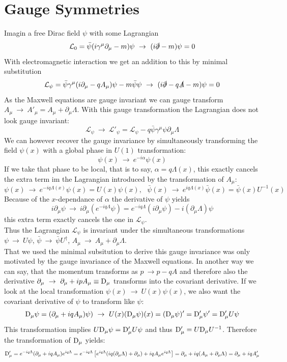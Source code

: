 \documentclass{include/thesisclass}
\newcommand{\LL}{\mathcal{L}}
\newcommand{\Dd}{{\rm D}}
\newcommand{\df}{\rightarrow}
\newcommand{\p}{\partial}
\begin{document}
\section{Gauge Symmetries}
Imagin a free Dirac field $\psi$ with some Lagrangian
\[ \LL_0 = \bar{\psi}( i \gamma^\mu \p_\mu - m) \psi ~\df~(i \slashed{\p} - m )\psi = 0\]
With electromagnetic interaction we get an addition to this by minimal substitution
\[ \LL_\psi = \bar{\psi}\gamma^\mu ( i \p_\mu - q A_\mu) \psi - m \bar{\psi}\psi ~\df~ (i \slashed{\p} - q \slashed{A}- m) \psi = 0\]
As the Maxwell equations are gauge invariant we can gauge transform $A_\mu ~\df~A'_\mu = A_\mu + \p_\mu \Lambda$. With this gauge transformation the Lagrangian does not look gauge invariant:
\[\LL_\psi ~\df~ \LL'_\psi = \LL_\psi - q \bar{\psi}\gamma^\mu \psi \p_\mu \Lambda\]
We can however recover the gauge invariance by simultaneously transforming the field $\psi(x)$ with a global phase in $U(1)$ transformation:
\[ \psi(x) ~\df~ e^{-i \alpha} \psi(x)\]
If we take that phase to be local, that is to say, $\alpha = q \Lambda(x)$, this exactly cancels the extra term im the Lagrangian introduced by the transformation of $A_\mu$:
\[ \psi(x) ~\df~ e^{-iq \Lambda(x)} \psi(x) = U(x) \psi(x),~~~ \bar{\psi}(x) ~\df~ e^{iq\Lambda(x)} \bar{\psi}(x) = \bar{\psi}(x) U^{-1}(x)\]
Because of the $x$-dependance of $\alpha$ the derivative of $\psi$ yields
\[ i \p_\mu \psi ~\df~ i \p_\mu ( e^{-iq\Lambda} \psi) = e^{-iq\Lambda}(i \p_\mu \psi) - i ( \p_\mu\Lambda) \psi\]
this extra term exactly cancels the one in $\LL_\psi$.\\
Thus the Lagrangian $\LL_\psi$ is invariant under the simultaneous transformations $\psi ~\df~U\psi$, $\bar{\psi}~\df~\bar{\psi}U^\dagger$, $A_\mu ~\df~A_\mu + \p_\mu \Lambda$.\\
That we used the minimal subsitution to derive this gauge invariance was only motivated by the gauge invariance of the Maxwell equations. In another way we can say, that the momentum transforms as $p ~\df p - q A$ and therefore also the derivative $\p_\mu ~\df~ \p_\mu + i p A_\mu \equiv \Dd_\mu$ transforms into the covariant derivative. If we look at the local transformation $\psi(x) ~\df~ U(x)\psi(x)$, we also want the covariant derivative of $\psi$ to transform like $\psi$:
\[ \Dd_\mu \psi = ( \p _\mu + i q A_\mu) \psi) ~\df~ U(x)( \Dd_\mu \psi)(x) = (\Dd_\mu\psi)' = \Dd'_\mu \psi' = \Dd'_\mu U \psi \]
This transformation implies $U\Dd_\mu \psi = \Dd'_\mu U \psi$ and thus $\Dd'_\mu = U \Dd_\mu U^{-1}$. Therefore the transformation of $\Dd_\mu$ yields:
\[ \Dd'_\mu = e^{-iq\Lambda}( \p_\mu + i q A_\mu) e^{i q \Lambda} = e^{-iq\Lambda}\left[ e^{iq\Lambda}(iq (\p_\mu \Lambda) + \p_\mu) + i q A_\mu e^{iq\Lambda}\right] = \p_\mu + iq(A_\mu + \p_\mu \Lambda) = \p_\mu + iq A'_\mu\]
\end{document}
